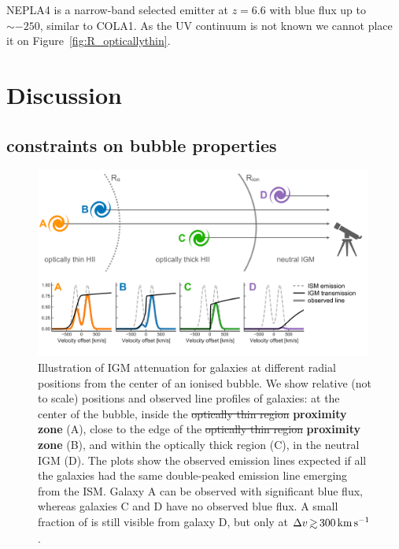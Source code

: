 \documentclass[fleqn,usenatbib]{mnras}
\providecommand{\DIFadd}[1]{{\protect\color{Green} \bf #1}} %
\providecommand{\DIFdel}[1]{{\protect\color{lightgray} \footnotesize \sout{#1}}} %
\providecommand{\DIFaddFL}[1]{\DIFadd{#1}} %
\providecommand{\DIFdelFL}[1]{\DIFdel{#1}} %
\providecommand{\DIFaddbeginFL}{} %
\providecommand{\DIFaddendFL}{} %
\providecommand{\DIFdelbeginFL}{} %
\providecommand{\DIFdelendFL}{} %
\newcommand{\DIFscaledelfig}{0.5}
\newlength{\DIFdelgraphicswidth} %
\newlength{\DIFdelgraphicsheight} %
\newcommand{\DIFaddincludegraphics}[2][]{{\color{blue}\fbox{\DIFOincludegraphics[#1]{#2}}}} %
\newcommand{\DIFdelincludegraphics}[2][]{%
\sbox{\DIFdelgraphicsbox}{\DIFOincludegraphics[#1]{#2}}%
\settoboxwidth{\DIFdelgraphicswidth}{\DIFdelgraphicsbox} %
\settoboxtotalheight{\DIFdelgraphicsheight}{\DIFdelgraphicsbox} %
\scalebox{\DIFscaledelfig}{%
\parbox[b]{\DIFdelgraphicswidth}{\usebox{\DIFdelgraphicsbox}\\[-\baselineskip] \rule{\DIFdelgraphicswidth}{0em}}\llap{\resizebox{\DIFdelgraphicswidth}{\DIFdelgraphicsheight}{%
\setlength{\unitlength}{\DIFdelgraphicswidth}%
\begin{picture}(1,1)%
\thicklines\linethickness{2pt} %
{\color[rgb]{1,0,0}\put(0,0){\framebox(1,1){}}}%
{\color[rgb]{1,0,0}\put(0,0){\line( 1,1){1}}}%
{\color[rgb]{1,0,0}\put(0,1){\line(1,-1){1}}}%
\end{picture}%
}\hspace*{3pt}}} %
} %
\DeclareRobustCommand{\DIFaddbeginFL}{\DIFOaddbeginFL \let\includegraphics\DIFaddincludegraphics} %
\DeclareRobustCommand{\DIFaddendFL}{\DIFOaddendFL \let\includegraphics\DIFOincludegraphics} %
\DeclareRobustCommand{\DIFdelbeginFL}{\DIFOdelbeginFL \let\includegraphics\DIFdelincludegraphics} %
\DeclareRobustCommand{\DIFdelendFL}{\DIFOaddendFL \let\includegraphics\DIFOincludegraphics} %
\begin{document}
NEPLA4 \citep{Songaila2018} is a narrow-band selected \lya emitter at $z=6.6$ with blue flux up to $\sim-250$\kms, similar to COLA1. As the UV continuum is not known we cannot place it on Figure~\ref{fig:R_opticallythin}.

\section{Discussion}
\label{sec:disc}

\subsection{\lya constraints on bubble properties}
\label{sec:disc_redpeaks}

\begin{figure}
    \includegraphics[width=0.99\textwidth]{figs/fig8.pdf}
    \caption{Illustration of IGM attenuation for galaxies at different radial positions from the center of an ionised bubble. We show relative (not to scale) positions and observed line profiles of galaxies: at the center of the bubble, inside the \DIFdelbeginFL \DIFdelFL{optically thin region }\DIFdelendFL \DIFaddbeginFL \DIFaddFL{proximity zone }\DIFaddendFL (A), close to the edge of the \DIFdelbeginFL \DIFdelFL{optically thin region }\DIFdelendFL \DIFaddbeginFL \DIFaddFL{proximity zone }\DIFaddendFL (B), and within the optically thick region (C), in the neutral IGM (D). The plots show the observed \lya emission lines expected if all the galaxies had the same double-peaked emission line emerging from the ISM. Galaxy A can be observed with significant blue flux, whereas galaxies C and D have no observed blue flux. A small fraction of \lya is still visible from galaxy D, but only at $\DV\simgt300\kms$ .}
    \label{fig:cartoon}
\end{figure}
\end{document}

